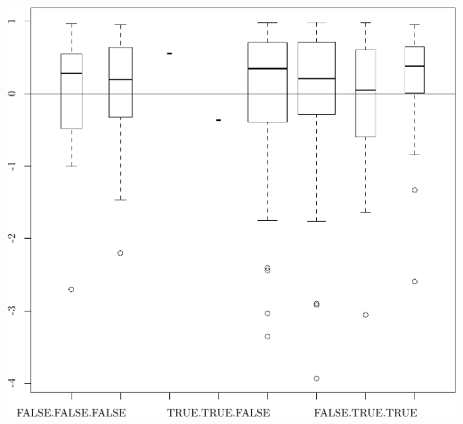 \documentclass{article}
\begin{document}
\begin{knitrout}
{}


\begin{kframe}\begin{alltt}
\hlstd{(}  \hlstd{=} \hlstd{)} \hlopt{~} \hlopt{$} \hlopt{+} \hlopt{$} \hlopt{+} \hlopt{$}  \hlstd{=} \hlstd{)}
\hlstd{(} \hlstd{=} \hlstd{)}
\end{alltt}
\end{kframe}

{\centering \includegraphics[width=\maxwidth]{figure/05-eda-outliers-full-4} 

}



\end{knitrout}
\end{document}
